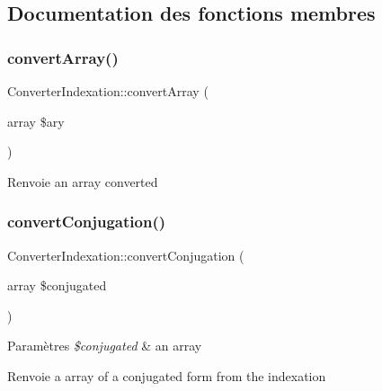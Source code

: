 \subsection{Documentation des fonctions membres}
\hypertarget{classConverterIndexation_a171eb2b7d4d6452218212da881972dfd}{}\label{classConverterIndexation_a171eb2b7d4d6452218212da881972dfd} 
\subsubsection{\texorpdfstring{convert\+Array()}{convertArray()}}
{\footnotesize\ttfamily Converter\+Indexation\+::convert\+Array (\begin{DoxyParamCaption}\item[{array}]{\$ary }\end{DoxyParamCaption})}

\begin{DoxyReturn}{Renvoie}
an array converted 
\end{DoxyReturn}
\hypertarget{classConverterIndexation_a3d6b48ec5eaf46b9a2a8b3bdc200e063}{}\label{classConverterIndexation_a3d6b48ec5eaf46b9a2a8b3bdc200e063} 
\subsubsection{\texorpdfstring{convert\+Conjugation()}{convertConjugation()}}
{\footnotesize\ttfamily Converter\+Indexation\+::convert\+Conjugation (\begin{DoxyParamCaption}\item[{array}]{\$conjugated }\end{DoxyParamCaption})}


\begin{DoxyParams}{Paramètres}
{\em \$conjugated} & an array \\
\hline
\end{DoxyParams}
\begin{DoxyReturn}{Renvoie}
a array of a conjugated form from the indexation 
\end{DoxyReturn}
\hypertarget{classConverterIndexation_a066755523513b6c4197765c631c7b248}{}\label{classConverterIndexation_a066755523513b6c4197765c631c7b248} 
